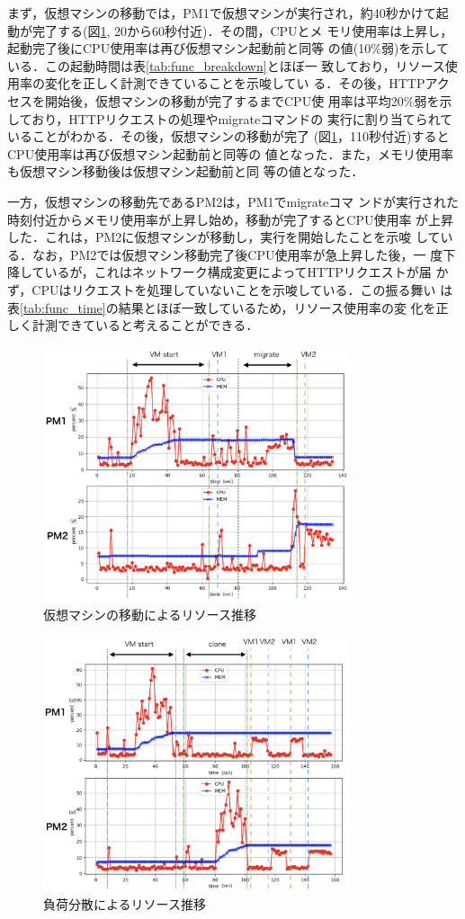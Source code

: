 \documentclass[submit,techrep]{ipsj}
\begin{document}
まず，仮想マシンの移動では，PM1で仮想マシンが実行され，約40秒かけて起
動が完了する(図\ref{fig:graph_migrate}, 20から60秒付近)．その間，CPUとメ
モリ使用率は上昇し，起動完了後にCPU使用率は再び仮想マシン起動前と同等
の値(10\%弱)を示している．この起動時間は表\ref{tab:func_breakdown}とほぼ一
致しており，リソース使用率の変化を正しく計測できていることを示唆してい
る．その後，HTTPアクセスを開始後，仮想マシンの移動が完了するまでCPU使
用率は平均20\%弱を示しており，HTTPリクエストの処理やmigrateコマンドの
実行に割り当てられていることがわかる．その後，仮想マシンの移動が完了
(図\ref{fig:graph_migrate}，110秒付近)するとCPU使用率は再び仮想マシン起動前と同等の
値となった．また，メモリ使用率も仮想マシン移動後は仮想マシン起動前と同
等の値となった．

一方，仮想マシンの移動先であるPM2は，PM1でmigrateコマ
ンドが実行された時刻付近からメモリ使用率が上昇し始め，移動が完了するとCPU使用率
が上昇した．これは，PM2に仮想マシンが移動し，実行を開始したことを示唆
している．なお，PM2では仮想マシン移動完了後CPU使用率が急上昇した後，一
度下降しているが，これはネットワーク構成変更によってHTTPリクエストが届
かず，CPUはリクエストを処理していないことを示唆している．この振る舞い
は表\ref{tab:func_time}の結果とほぼ一致しているため，リソース使用率の変
化を正しく計測できていると考えることができる．


\begin{figure}[tb]
	\includegraphics[width=9.0cm,bb=0 0 805 667]{fig/migrate.png}
	\caption{仮想マシンの移動によるリソース推移}
	\label{fig:graph_migrate}
\end{figure}

\begin{figure}[tb]
	\includegraphics[width=9.0cm,bb=0 0 810 668]{fig/clone.png}
	\caption{負荷分散によるリソース推移}
	\label{fig:graph_clone}
\end{figure}
\end{document}
